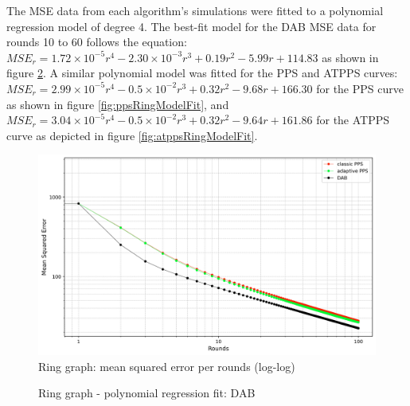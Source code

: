 The MSE data from each algorithm's simulations were fitted to a polynomial regression model of degree 4. The best-fit model for the DAB MSE data for rounds 10 to 60 follows the equation: $MSE_r=1.72\times 10^{-5}r^{4}-2.30\times 10^{-3}r^{3}+ 0.19r^{2}-5.99r+114.83$ as shown in figure \ref{fig:dabRingModelFit}. A similar polynomial model was fitted for the PPS and ATPPS curves: $MSE_r= 2.99\times 10^{-5}r^{4}-0.5\times 10^{-2}r^{3} + 0.32r^{2} -9.68r + 166.30$ for the PPS curve as shown in figure \ref{fig:ppsRingModelFit}, and $MSE_r=3.04\times 10^{-5}r^{4}-0.5\times 10^{-2}r^{3} + 0.32r^{2}-9.64r+161.86$ for the ATPPS curve as depicted in figure \ref{fig:atppsRingModelFit}.

\begin{figure}[]
    \centering
    \includegraphics[width=\linewidth]{figures/Simulation_outcomes/RingGraph/DAB_vs_PPS_RG_r100_n1024_averaged_loglog.png}
    \caption{Ring graph: mean squared error per rounds (log-log)}
    \label{fig:ringgraphMSEperRoundLogLog}
\end{figure}
\begin{figure}[]
    \centering
    \caption{Ring graph - polynomial regression fit: DAB}
    \label{fig:dabRingModelFit}
\end{figure}
